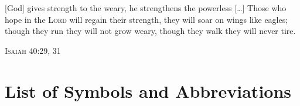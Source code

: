 \documentclass[10pt, a4paper]{article}
\numberwithin{equation}{section} %
\theoremstyle{definition}
\theoremstyle{plain}
\newcommand{\?}{\mathrel{?}} %
\begin{document}
    \epigraph{[God] gives strength to the weary, he strengthens the powerless [\ldots] Those who hope in the \textsc{Lord} will regain their strength, they will soar on wings like eagles; though they run they will not grow weary, though they walk they will never tire.}{\textsc{Isaiah} 40:29, 31}

    \clearpage

    \tableofcontents
    \clearpage

    \listoffigures
    \clearpage

    \listoftables
    \clearpage

    \section*{List of Symbols and Abbreviations}
\end{document}
